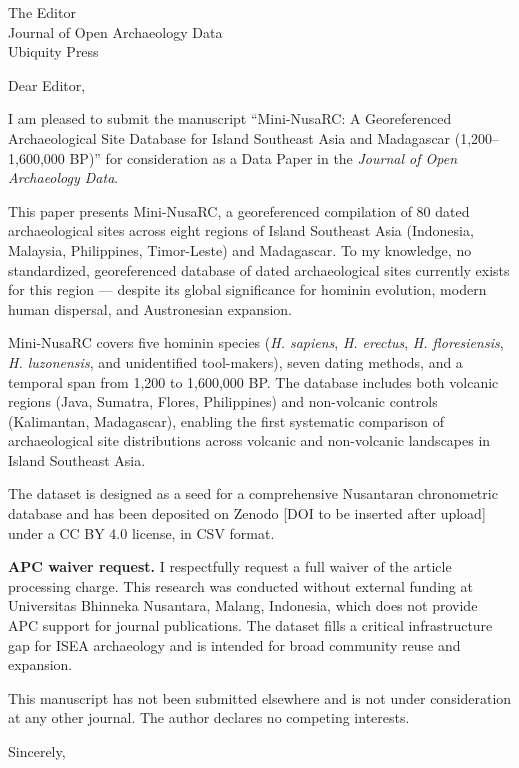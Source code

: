 \documentclass[11pt]{letter}
\begin{document}
\begin{letter}{The Editor\\
Journal of Open Archaeology Data\\
Ubiquity Press}

\opening{Dear Editor,}

I am pleased to submit the manuscript ``Mini-NusaRC: A Georeferenced Archaeological Site Database for Island Southeast Asia and Madagascar (1,200--1,600,000 BP)'' for consideration as a Data Paper in the \textit{Journal of Open Archaeology Data}.

This paper presents Mini-NusaRC, a georeferenced compilation of 80 dated archaeological sites across eight regions of Island Southeast Asia (Indonesia, Malaysia, Philippines, Timor-Leste) and Madagascar. To my knowledge, no standardized, georeferenced database of dated archaeological sites currently exists for this region --- despite its global significance for hominin evolution, modern human dispersal, and Austronesian expansion.

Mini-NusaRC covers five hominin species (\textit{H. sapiens}, \textit{H. erectus}, \textit{H. floresiensis}, \textit{H. luzonensis}, and unidentified tool-makers), seven dating methods, and a temporal span from 1,200 to 1,600,000 BP. The database includes both volcanic regions (Java, Sumatra, Flores, Philippines) and non-volcanic controls (Kalimantan, Madagascar), enabling the first systematic comparison of archaeological site distributions across volcanic and non-volcanic landscapes in Island Southeast Asia.

The dataset is designed as a seed for a comprehensive Nusantaran chronometric database and has been deposited on Zenodo [DOI to be inserted after upload] under a CC BY 4.0 license, in CSV format.

\textbf{APC waiver request.} I respectfully request a full waiver of the article processing charge. This research was conducted without external funding at Universitas Bhinneka Nusantara, Malang, Indonesia, which does not provide APC support for journal publications. The dataset fills a critical infrastructure gap for ISEA archaeology and is intended for broad community reuse and expansion.

This manuscript has not been submitted elsewhere and is not under consideration at any other journal. The author declares no competing interests.

\closing{Sincerely,}

\end{letter}
\end{document}
